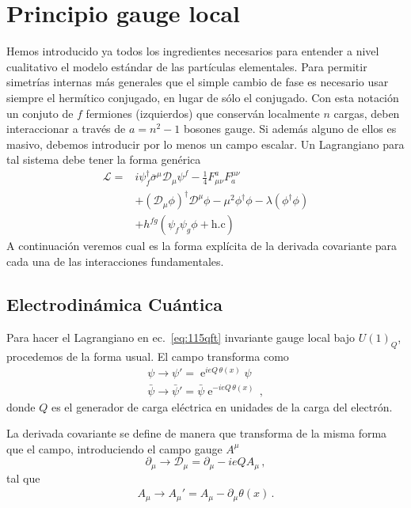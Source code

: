 \chapter{Principio gauge local}

Hemos introducido ya todos los ingredientes necesarios para entender a nivel cualitativo el modelo estándar de las partículas elementales. Para permitir simetrías internas más generales que el simple cambio de fase es necesario usar siempre el hermítico conjugado, en lugar de sólo el conjugado. Con esta notación un conjuto de $f$ fermiones (izquierdos) que conserván localmente $n$ cargas, deben interaccionar a través de $a=n^2-1$ bosones gauge. Si además alguno de ellos es masivo, debemos introducir por lo menos un campo escalar. Un Lagrangiano para tal sistema debe tener la forma genérica
\begin{align}
  \mathcal{L}=&i \psi^{\dagger}_f \overline{\sigma}^{\mu}\mathcal{D}_{\mu} \psi^f-\frac{1}{4}F_{\mu\nu}^{a} F^{\mu\nu}_a \nonumber\\
              &+\left( \mathcal{D}_{\mu}\phi \right)^{\dagger} \mathcal{D}^{\mu}\phi-\mu^2 \phi^{\dagger} \phi-\lambda \left(\phi^{\dagger} \phi  \right) \nonumber\\
              &+h^{fg} \left( \psi_f\psi_g \phi + \text{h.c} \right)
 \end{align}
A continuación veremos cual es la forma explícita de la derivada covariante para cada una de las interacciones fundamentales.

\section{Electrodinámica Cuántica}
\label{sec:electr-cuant}

Para hacer el Lagrangiano en ec.~\eqref{eq:115qft} invariante gauge local bajo $U(1)_Q$, procedemos de la forma usual. El campo transforma como
\begin{align}
  \psi\to\psi'=\operatorname{e}^{ieQ\, \theta(x)}\psi\nonumber\\
  \bar{\psi}\to\bar{\psi}'=\bar{\psi}\operatorname{e}^{-ieQ\,\theta(x)}\,,
\end{align}
donde $Q$ es el generador de carga eléctrica en unidades de la carga del electrón.

La derivada covariante se define de manera que transforma de la misma forma que el campo, introduciendo el campo gauge $A^\mu$
\begin{equation}
  \label{eq:202qft}
  \partial_\mu\to\mathcal{D}_\mu=\partial_\mu-ieQA_\mu\,,
\end{equation}
tal que
\begin{align}
  A_{\mu}\to A_{\mu}'=A_{\mu}-\partial_{\mu}\theta(x)\,.
\end{align}

